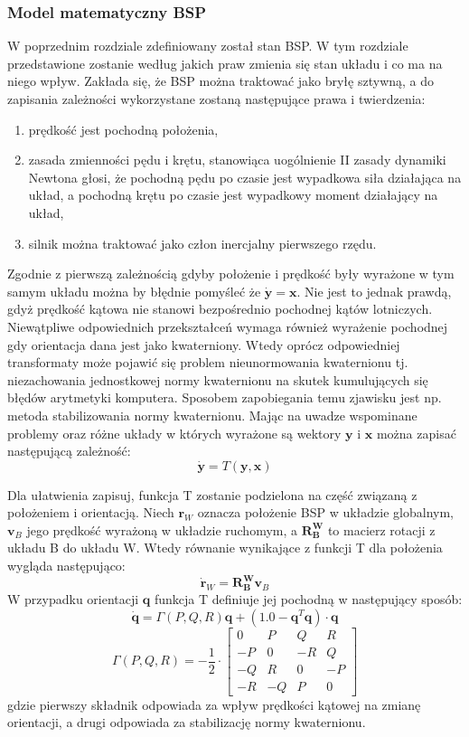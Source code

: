 \subsubsection{Model matematyczny BSP}

W poprzednim rozdziale zdefiniowany został stan BSP. W tym rozdziale przedstawione zostanie według jakich praw zmienia się stan układu i co ma na niego wpływ. Zakłada się, że BSP można traktować jako bryłę sztywną, a do zapisania zależności wykorzystane zostaną następujące prawa i twierdzenia:

\begin{enumerate}
\item prędkość jest pochodną położenia,
\item zasada zmienności pędu i krętu, stanowiąca uogólnienie II zasady dynamiki Newtona głosi, że pochodną pędu po czasie jest wypadkowa siła działająca na układ, a pochodną krętu po czasie jest wypadkowy moment działający na układ,
\item silnik można traktować jako człon inercjalny pierwszego rzędu.
\end{enumerate}

Zgodnie z pierwszą zależnością gdyby położenie i prędkość były wyrażone w tym samym układu można by błędnie pomyśleć że $\bm{\dot{y}} = \bm{x}$. Nie jest to jednak prawdą, gdyż prędkość kątowa nie stanowi bezpośrednio pochodnej kątów lotniczych. Niewątpliwe odpowiednich przekształceń wymaga również wyrażenie pochodnej gdy orientacja dana jest jako kwaterniony. Wtedy oprócz odpowiedniej transformaty może pojawić się problem nieunormowania kwaternionu tj. niezachowania jednostkowej normy kwaternionu na skutek kumulujących się błędów arytmetyki komputera. Sposobem zapobiegania temu zjawisku jest np. metoda stabilizowania normy kwaternionu. Mając na uwadze wspominane problemy oraz różne układy w których wyrażone są wektory $\bm{y}$ i $\bm{x}$ można zapisać następującą zależność:
\[
	\bm{\dot{y}} = T(\bm{y}, \bm{x})
\]

Dla ułatwienia zapisuj, funkcja T zostanie podzielona na część związaną z położeniem i orientacją. Niech $\bm{r}_W$ oznacza położenie BSP w układzie globalnym, $\bm{v}_B$ jego prędkość wyrażoną w układzie ruchomym, a $\bm{R_B^W}$ to macierz rotacji z układu B do układu W. Wtedy równanie wynikające z funkcji T dla położenia wygląda następująco:
\[
	\bm{\dot{r}}_W = \bm{R_B^W} \bm{v}_B
\]
W przypadku orientacji $\bm{q}$ funkcja T definiuje jej pochodną w następujący sposób:
\[
	\bm{\dot{q}} = 	\Gamma(P,Q,R) \bm{q} +\left ( 1.0 - \bm{q}^T \bm{q} \right) \cdot \bm{q}
\]
\[
	\Gamma(P,Q,R) = - \frac{1}{2} \cdot \begin{bmatrix}
	0 & P & Q & R \\ -P & 0 & -R & Q \\ -Q & R & 0 & -P \\ -R & -Q & P & 0
	\end{bmatrix}
\]
gdzie pierwszy składnik odpowiada za wpływ prędkości kątowej na zmianę orientacji, a drugi odpowiada za stabilizację normy kwaternionu.\\

